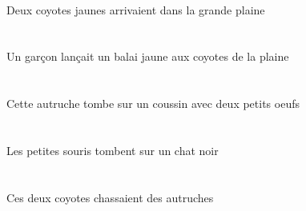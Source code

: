 \begin{exe}
\INDDuAbsG{}   \jauneADuG{}   \coyoteADuAbsG{}    \DEFSgOblG{}   \grandCSgG{}   \plaineCSgOblG{}   \DANSG{}  \arriverViPstADuG{}\\
Deux coyotes jaunes arrivaient dans la grande plaine
\ex\glll
\INDSgErg{}   \garconBSgErg{}    \DEFPlDat{}    \DEFSgObl{}   \plaineCSgObl{}   \DE{}   \coyoteAPlDat{}   \INDSgAbs{}   \jauneCSg{}   \balaiCSgAbs{}  \lancerVdPstCSg{}\\
\INDSgErgP{}   \garconBSgErgP{}    \DEFPlDatP{}    \DEFSgOblP{}   \plaineCSgOblP{}   \DEP{}   \coyoteAPlDatP{}   \INDSgAbsP{}   \jauneCSgP{}   \balaiCSgAbsP{}  \lancerVdPstCSgP{}\\
\INDSgErgG{}   \garconBSgErgG{}    \DEFPlDatG{}    \DEFSgOblG{}   \plaineCSgOblG{}   \DEG{}   \coyoteAPlDatG{}   \INDSgAbsG{}   \jauneCSgG{}   \balaiCSgAbsG{}  \lancerVdPstCSgG{}\\
Un garçon lançait un balai jaune aux coyotes de la plaine
\ex\glll
\INDDuObl{}   \petitDDu{}   \oeufDDuObl{}   \AVEC{}   \DEMSgAbs{}   \autrucheDSgAbs{}    \INDSgObl{}   \coussinASgObl{}   \SUR{}  \tomberViPrsDSg{}\\
\INDDuOblP{}   \petitDDuP{}   \oeufDDuOblP{}   \AVECP{}   \DEMSgAbsP{}   \autrucheDSgAbsP{}    \INDSgOblP{}   \coussinASgOblP{}   \SURP{}  \tomberViPrsDSgP{}\\
\INDDuOblG{}   \petitDDuG{}   \oeufDDuOblG{}   \AVECG{}   \DEMSgAbsG{}   \autrucheDSgAbsG{}    \INDSgOblG{}   \coussinASgOblG{}   \SURG{}  \tomberViPrsDSgG{}\\
Cette autruche tombe sur un coussin avec deux petits oeufs
\ex\glll
\DEFPlAbs{}   \petitAPl{}   \sourisAPlAbs{}    \INDSgObl{}   \noirDSg{}   \chatDSgObl{}   \SUR{}  \tomberViPrsAPl{}\\
\DEFPlAbsP{}   \petitAPlP{}   \sourisAPlAbsP{}    \INDSgOblP{}   \noirDSgP{}   \chatDSgOblP{}   \SURP{}  \tomberViPrsAPlP{}\\
\DEFPlAbsG{}   \petitAPlG{}   \sourisAPlAbsG{}    \INDSgOblG{}   \noirDSgG{}   \chatDSgOblG{}   \SURG{}  \tomberViPrsAPlG{}\\
Les petites souris tombent sur un chat noir
\ex\glll
\DEMDuErg{}   \coyoteADuErg{}   \INDPlAbs{}   \autrucheDPlAbs{}  \chasserVtPstDPl{}\\
\DEMDuErgP{}   \coyoteADuErgP{}   \INDPlAbsP{}   \autrucheDPlAbsP{}  \chasserVtPstDPlP{}\\
\DEMDuErgG{}   \coyoteADuErgG{}   \INDPlAbsG{}   \autrucheDPlAbsG{}  \chasserVtPstDPlG{}\\
Ces deux coyotes chassaient des autruches
\ex\glll
\DEFPlErg{}   \coyoteAPlErg{}    \DEMPlDat{}   \chatDPlDat{}   \INDSgAbs{}   \sourisASgAbs{}  \lancerVdPstASg{}\\

\end{exe}
